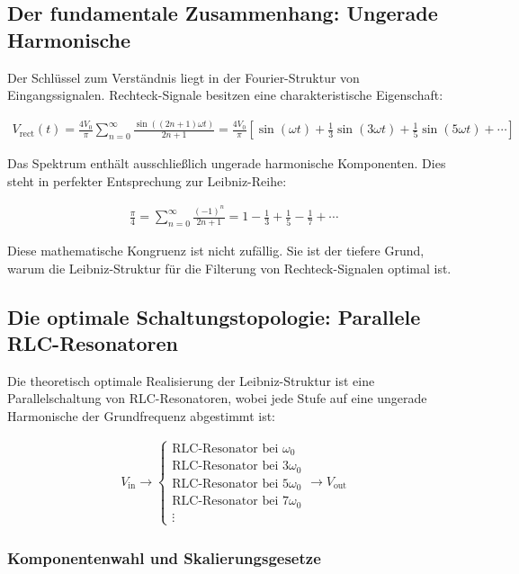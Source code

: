 \documentclass[a4paper, 12pt, twoside, openright]{report}
\theoremstyle{definition}
\theoremstyle{definition}
\begin{document}
\subsection{Der fundamentale Zusammenhang: Ungerade Harmonische}

Der Schlüssel zum Verständnis liegt in der Fourier-Struktur von Eingangssignalen. Rechteck-Signale besitzen eine charakteristische Eigenschaft:

\begin{align}
	V_{\text{rect}}(t) = \frac{4V_0}{\pi} \sum_{n=0}^{\infty} \frac{\sin((2n+1)\omega t)}{2n+1}
	= \frac{4V_0}{\pi} \left[ \sin(\omega t) + \frac{1}{3}\sin(3\omega t) + \frac{1}{5}\sin(5\omega t) + \cdots \right]
\end{align}

Das Spektrum enthält ausschließlich ungerade harmonische Komponenten. Dies steht in perfekter Entsprechung zur Leibniz-Reihe:

\begin{align}
	\frac{\pi}{4} = \sum_{n=0}^{\infty} \frac{(-1)^n}{2n+1} = 1 - \frac{1}{3} + \frac{1}{5} - \frac{1}{7} + \cdots
\end{align}

Diese mathematische Kongruenz ist nicht zufällig. Sie ist der tiefere Grund, warum die Leibniz-Struktur für die Filterung von Rechteck-Signalen optimal ist.

\subsection{Die optimale Schaltungstopologie: Parallele RLC-Resonatoren}

Die theoretisch optimale Realisierung der Leibniz-Struktur ist eine Parallelschaltung von RLC-Resonatoren, wobei jede Stufe auf eine ungerade Harmonische der Grundfrequenz abgestimmt ist:

\begin{align}
	V_{\text{in}} \longrightarrow \begin{cases}
		\text{RLC-Resonator bei } \omega_0 \\
		\text{RLC-Resonator bei } 3\omega_0 \\
		\text{RLC-Resonator bei } 5\omega_0 \\
		\text{RLC-Resonator bei } 7\omega_0 \\
		\vdots
	\end{cases} \longrightarrow V_{\text{out}}
\end{align}

\subsubsection*{Komponentenwahl und Skalierungsgesetze}
\end{document}

